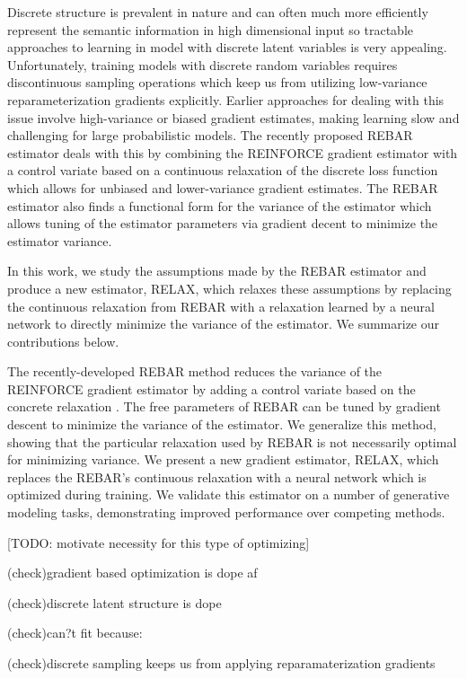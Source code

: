 \documentclass{article}
\begin{document}
Discrete structure is prevalent in nature and can often much more efficiently represent the semantic information in high dimensional input so tractable approaches to learning in model with discrete latent variables is very appealing.
Unfortunately, training models with discrete random variables requires discontinuous sampling operations which keep us from utilizing low-variance reparameterization gradients explicitly.
Earlier approaches for dealing with this issue involve high-variance or biased gradient estimates, making learning slow and challenging for large probabilistic models.
The recently proposed REBAR estimator deals with this by combining the REINFORCE gradient estimator with a control variate based on a continuous relaxation of the discrete loss function which allows for unbiased and lower-variance gradient estimates.
The REBAR estimator also finds a functional form for the variance of the estimator which allows tuning of the estimator parameters via gradient decent to minimize the estimator variance. 

In this work, we study the assumptions made by the REBAR estimator and produce a new estimator, RELAX, which relaxes these assumptions by replacing the continuous relaxation from REBAR with a relaxation learned by a neural network to directly minimize the variance of the estimator.
We summarize our contributions below. 

The recently-developed REBAR method \citep{tucker2017rebar} reduces the variance of the REINFORCE gradient estimator by adding a control variate based on the concrete relaxation \citep{maddison2016concrete}.
The free parameters of REBAR can be tuned by gradient descent to minimize the variance of the estimator.
We generalize this method, showing that the particular relaxation used by REBAR is not necessarily optimal for minimizing variance. We present a new gradient estimator, RELAX, which replaces the REBAR's continuous relaxation with a neural network which is optimized during training. We validate this estimator on a number of generative modeling tasks, demonstrating improved performance over competing methods. 


[TODO: motivate necessity for this type of optimizing]

(check)gradient based optimization is dope af

(check)discrete latent structure is dope

(check)can?t fit because:

(check)discrete sampling keeps us from applying reparamaterization gradients 
\end{document}
